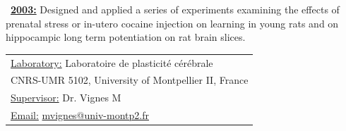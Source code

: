 \documentclass[a4paper,12pt,oneside]{letter}
\begin{document}
{\begin{minipage}[c]{7.7cm}
\textbullet~\underline{\textbf{2003:}}	Designed and applied a series of experiments examining the effects of prenatal stress or in-utero cocaine injection on learning in young rats and on hippocampic long term potentiation on rat brain slices.
\end{minipage}
\hspace{3mm}
\begin{minipage}[c]{\textwidth}
\setlength\minrowclearance{0.1cm}
\setlength\arrayrulewidth{1.5pt}
\small
\begin{tabular}[c]{|l|}\hline
\underline{Laboratory:} Laboratoire de plasticité cérébrale\\
CNRS-UMR 5102, University of Montpellier II, France\\
\underline{Supervisor:} Dr. Vignes M\\
\underline{Email:} \href{mailto:mvignes@univ-montp2.fr}{mvignes@univ-montp2.fr}\\ \hline
\end{tabular}
\end{minipage}
 

}
\end{document}
